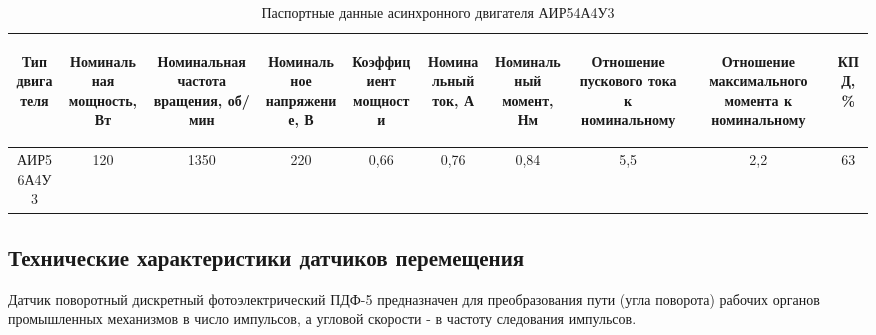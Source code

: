         \begin{longtable}{|c|c|c|c|c|c|c|c|c|c|}
            \caption{Паспортные данные асинхронного двигателя АИР54А4У3
                \label{table:motor-params}}\\
            \hline
            \begin{sideways} Тип двигателя \end{sideways} &
            \begin{sideways} \parbox{6cm}{%
                Номинальная мощность, Вт} \end{sideways} &
            \begin{sideways} \parbox{6cm}{%
                Номинальная  частота вращения, об/мин} \end{sideways} &
            \begin{sideways} \parbox{6cm}{%
                Номинальное напряжение, В} \end{sideways} &
            \begin{sideways} Коэффициент мощности \end{sideways} &
            \begin{sideways} Номинальный ток, А \end{sideways} &
            \begin{sideways} Номинальный момент, Нм \end{sideways} &
            \begin{sideways} \parbox{6cm}{%
                Отношение пускового тока к номинальному} \end{sideways} &
            \begin{sideways} \parbox{6cm}{%
                Отношение максимального момента к номинальному} \end{sideways} &
            \begin{sideways} КПД,\% \end{sideways}\\
            \hline
            \endfirsthead
            АИР56А4У3 & 120 & 1350 & 220 & 0,66 & 0,76 & 0,84 & 5,5 & 2,2 & 63\\
            \hline
        \end{longtable}	

    \subsection{Технические характеристики датчиков перемещения}
        Датчик поворотный дискретный фотоэлектрический ПДФ-5 предназначен
        для преобразования пути (угла поворота) рабочих органов промышленных
        механизмов в число импульсов, а угловой скорости - в частоту следования
        импульсов. 

